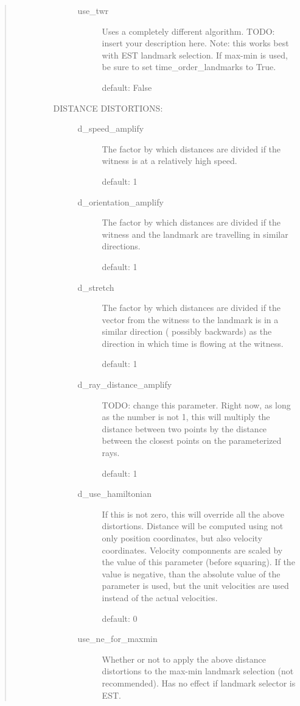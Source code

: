 \documentclass[letterpaper,10pt,openany,oneside,english]{sphinxmanual}
\begin{document}
\begin{fulllineitems}
\begin{quote}
\begin{description}
\begin{itemize}
\begin{description}
\begin{description}
\item[{use\_twr}] \leavevmode
Uses a completely different algorithm. TODO: insert your
description here. Note: this works best with EST landmark
selection. If max-min is used, be sure to set
time\_order\_landmarks to True.

default: False

\end{description}

\item[{DISTANCE DISTORTIONS:}] \leavevmode\begin{description}
\item[{d\_speed\_amplify}] \leavevmode
The factor by which distances are divided if the witness is
at a relatively high speed.

default: 1

\item[{d\_orientation\_amplify}] \leavevmode
The factor by which distances are divided if the witness and
the landmark are travelling in similar directions.

default: 1

\item[{d\_stretch}] \leavevmode
The factor by which distances are divided if the vector from
the witness to the landmark is in a similar direction (
possibly backwards) as the direction in which time is flowing
at the witness.

default: 1

\item[{d\_ray\_distance\_amplify}] \leavevmode
TODO: change this parameter. Right now, as long as the number
is not 1, this will multiply the distance between two points
by the distance between the closest points on the
parameterized rays.

default: 1

\item[{d\_use\_hamiltonian}] \leavevmode
If this is not zero, this will override all the above
distortions. Distance will be computed using not only
position coordinates, but also velocity coordinates. Velocity
componnents are scaled by the value of this parameter (before
squaring). If the value is negative, than the absolute value
of the parameter is used, but the unit velocities are used
instead of the actual velocities.

default: 0

\item[{use\_ne\_for\_maxmin}] \leavevmode
Whether or not to apply the above distance distortions to the
max-min landmark selection (not recommended). Has no effect
if landmark selector is EST.


\end{description}
\end{description}
\end{itemize}
\end{description}
\end{quote}
\end{fulllineitems}
\end{document}
